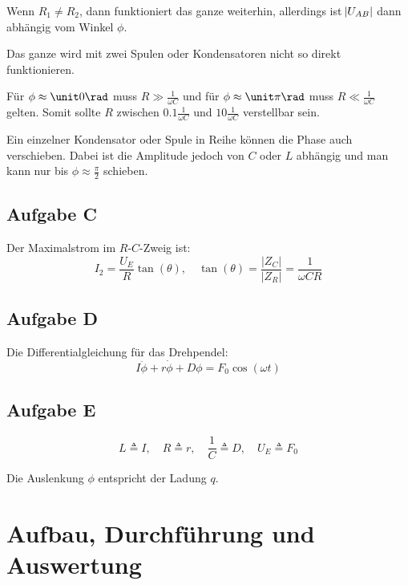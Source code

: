 \documentclass[11pt, ngerman]{article}
\begin{document}
Wenn $R_1 \neq R_2$, dann funktioniert das ganze weiterhin, allerdings ist
$\abs{U_{AB}}$ dann abhängig vom Winkel $\phi$.

Das ganze wird mit zwei Spulen oder Kondensatoren nicht so direkt
funktionieren.

Für $\phi \approx \unit 0 \rad$ muss $R \gg \frac 1{\omega C}$ und für $\phi
\approx \unit \pi \rad$ muss $R \ll \frac 1{\omega C}$ gelten. Somit sollte $R$
zwischen $0.1 \frac 1{\omega C}$ und $10 \frac 1{\omega C}$ verstellbar sein.

Ein einzelner Kondensator oder Spule in Reihe können die Phase auch
verschieben. Dabei ist die Amplitude jedoch von $C$ oder $L$ abhängig und man
kann nur bis $\phi \approx \frac \pi 2$ schieben.

\subsection{Aufgabe C}

Der Maximalstrom im $R$-$C$-Zweig ist:
\[
	I_2 = \frac{U_E}{R} \tan(\theta)
	, \quad
	\tan(\theta) = \frac{|Z_C|}{|Z_R|} = \frac 1{\omega C R}
\]

\subsection{Aufgabe D}

\label{Aufgabe D}

Die Differentialgleichung für das Drehpendel:
\[ I \ddot \phi + r \dot \phi + D \phi = F_0 \cos(\omega t) \]

\subsection{Aufgabe E}

\[
	L \triangleq I
	, \quad
	R \triangleq r
	, \quad
	\frac 1C \triangleq D
	, \quad
	U_E \triangleq F_0
\]

Die Auslenkung $\phi$ entspricht der Ladung $q$.


\section{Aufbau, Durchführung und Auswertung}
\end{document}
